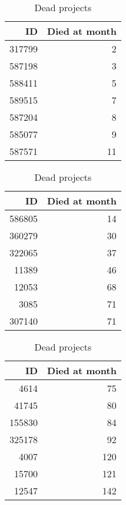 \begin{table}[ht]
\caption{Dead projects}\label{table:deads}
\centering
\begin{tabular}{rr}
  \hline
 \bfseries{ID}\rm & \bfseries{Died at month}\rm \\ 
  \hline
317799 &   2 \\ 
  587198 &   3 \\ 
  588411 &   5 \\ 
  589515 &   7 \\ 
  587204 &   8 \\ 
  585077 &   9 \\ 
  587571 &  11 \\
  \hline
\end{tabular}
\hspace{1em}
\begin{tabular}{rr}
  \hline
 \bfseries{ID}\rm & \bfseries{Died at month}\rm \\ 
  \hline 
  586805 &  14 \\ 
  360279 &  30 \\ 
  322065 &  37 \\ 
  11389 &  46 \\ 
  12053 &  68 \\ 
  3085 &  71 \\ 
  307140 &  71 \\ 
  \hline
\end{tabular}
\hspace{1em}
\begin{tabular}{rr}
  \hline
 \bfseries{ID}\rm & \bfseries{Died at month}\rm \\ 
  \hline
  4614 &  75 \\ 
  41745 &  80 \\ 
  155830 &  84 \\ 
  325178 &  92 \\ 
  4007 & 120 \\ 
  15700 & 121 \\ 
  12547 & 142 \\ 
   \hline
\end{tabular}
\end{table}
